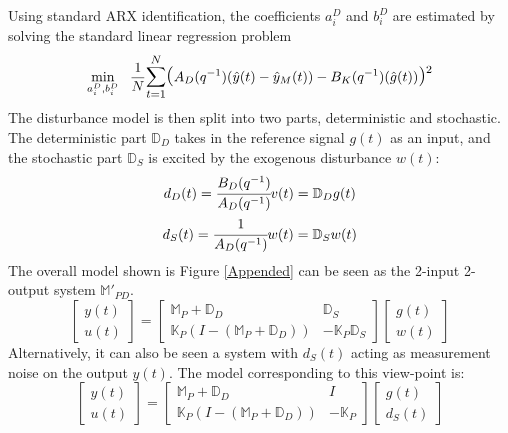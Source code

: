 \documentclass[letterpaper, 10 pt, conference]{ieeeconf}  %
\begin{document}
	Using standard ARX identification, the coefficients $a_i^D$ and $b_i^D$ are estimated by solving the standard linear regression problem
	\begin{equation}
	\small
	\begin{aligned}
	 \underset{a_i^D,b_i^D}{\text{min}}
	& \hspace{8pt} \frac{1}{N}\mathlarger{\sum\limits_{t=1}^N}\mathlarger{\mathlarger{(}}A_D(q^{-1})(\hat{y}(t)-\hat{y}_M(t))-B_K(q^{-1})(\hat{g}(t))\mathlarger{\mathlarger{)}}^2 \\
	\end{aligned}
	\label{DSensor}
	\end{equation}
	\normalsize
	The disturbance model is then split into two parts, deterministic and stochastic. The deterministic part $\mathbb{D}_D$ takes in the reference signal $g(t)$ as an input, and the stochastic part $\mathbb{D}_S$ is excited by the exogenous disturbance $w(t)$:
	\begin{equation*}
	\begin{matrix}
	d_D(t) = \cfrac{B_D(q^{-1})}{A_D(q^{-1})}v(t) = \mathbb{D}_D g(t) \vspace{4pt} \\  
	d_S(t) = \cfrac{1}{A_D(q^{-1})}w(t) = \mathbb{D}_S w(t)
	\end{matrix}
	\end{equation*}
	The overall model shown is Figure \ref{Appended} can be seen as the 2-input 2-output system $\mathbb{M}'_{PD}$.
	\begin{equation}
	\begin{bmatrix}
	y(t) \\ u(t)
	\end{bmatrix} = 
	\begin{bmatrix} 
	\mathbb{M}_P+\mathbb{D}_D & \mathbb{D}_S \\
	\mathbb{K}_P(I-(\mathbb{M}_P+\mathbb{D}_D)) &  -\mathbb{K}_P\mathbb{D}_S
	\end{bmatrix}
	\begin{bmatrix}
	g(t) \\ w(t)
	\end{bmatrix}
	\label{TF_w}
	\end{equation}
	Alternatively, it can also be seen a system with $d_S(t)$ acting as measurement noise on the output $y(t)$. The model corresponding to this view-point is:
	\begin{equation}
	\begin{bmatrix}
	y(t) \\ u(t)
	\end{bmatrix} = 
	\begin{bmatrix} 
	\mathbb{M}_P+\mathbb{D}_D & I \\
	\mathbb{K}_P(I-(\mathbb{M}_P+\mathbb{D}_D)) &  -\mathbb{K}_P
	\end{bmatrix}
	\begin{bmatrix}
	g(t) \\ d_S(t)
	\end{bmatrix}
	\label{TF_d}
	\end{equation} 
\end{document}
